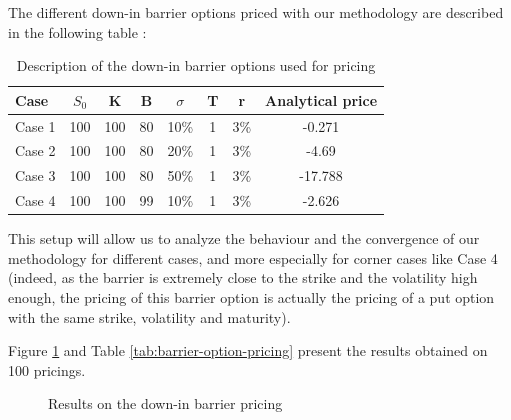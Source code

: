 \documentclass[a4paper,11pt,english]{book}
\begin{document}
The different down-in barrier options priced with our methodology are described in the following table :

\begin{table}[H]
\begin{center}
\begin{tabular}{l c c c c c c c} 
\cmidrule(l){1-8} 
Case & $S_{0}$ & K & B & $\sigma$ & T & r & Analytical price\\ %
\midrule %
Case 1 	&   100 &   100 &   80  & 	10\%    &   1    &   3\%    & -0.271\\
Case 2	&   100 &   100 &	80  & 	20\%    &   1    &   3\%    & -4.69\\
Case 3 &    100 &   100 &   80  &	50\%    &   1    &   3\%    & -17.788\\
Case 4 	&   100 &   100 &   99  &	10\%    &   1    &   3\%    & -2.626\\
\bottomrule %
\end{tabular}
\end{center}
    \caption{Description of the down-in barrier options used for pricing}
    \label{down-in-barriers}
\end{table}

This setup will allow us to analyze the behaviour and the convergence of our methodology for different cases, and more especially for corner cases like Case 4 (indeed, as the barrier is extremely close to the strike and the volatility high enough, the pricing of this barrier option is actually the pricing of a put option with the same strike, volatility and maturity).

Figure \ref{fig:down-in-barrier-pricing} and Table \ref{tab:barrier-option-pricing} present the results obtained on 100 pricings.

\begin{figure}[H]
\begin{center}
    \caption{Results on the down-in barrier pricing}
    \label{fig:down-in-barrier-pricing}
\end{center}
\end{figure}
\end{document}
